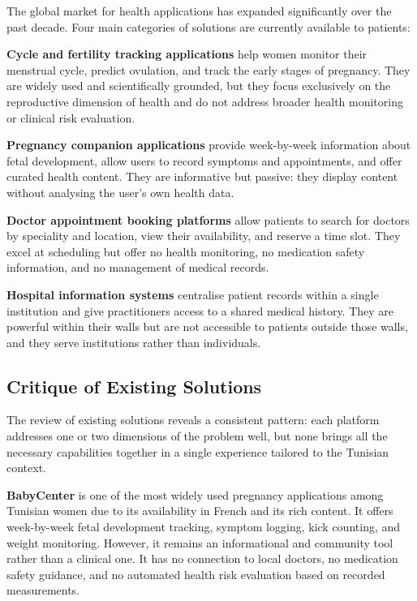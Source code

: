 The global market for health applications has expanded significantly over the past decade.
Four main categories of solutions are currently available to patients:

\textbf{Cycle and fertility tracking applications} help women monitor their menstrual cycle,
predict ovulation, and track the early stages of pregnancy. They are widely used and
scientifically grounded, but they focus exclusively on the reproductive dimension of health
and do not address broader health monitoring or clinical risk evaluation.

\textbf{Pregnancy companion applications} provide week-by-week information about fetal
development, allow users to record symptoms and appointments, and offer curated health
content. They are informative but passive: they display content without analysing the
user's own health data.

\textbf{Doctor appointment booking platforms} allow patients to search for doctors by
speciality and location, view their availability, and reserve a time slot. They excel at
scheduling but offer no health monitoring, no medication safety information, and no
management of medical records.

\textbf{Hospital information systems} centralise patient records within a single institution
and give practitioners access to a shared medical history. They are powerful within their
walls but are not accessible to patients outside those walls, and they serve institutions
rather than individuals.



\subsection{Critique of Existing Solutions}
The review of existing solutions reveals a consistent pattern: each platform addresses one
or two dimensions of the problem well, but none brings all the necessary capabilities
together in a single experience tailored to the Tunisian context.

\textbf{BabyCenter} is one of the most widely used pregnancy applications among Tunisian
women due to its availability in French and its rich content. It offers week-by-week
fetal development tracking, symptom logging, kick counting, and weight monitoring.
However, it remains an informational and community tool rather than a clinical one.
It has no connection to local doctors, no medication safety guidance, and no automated
health risk evaluation based on recorded measurements.

